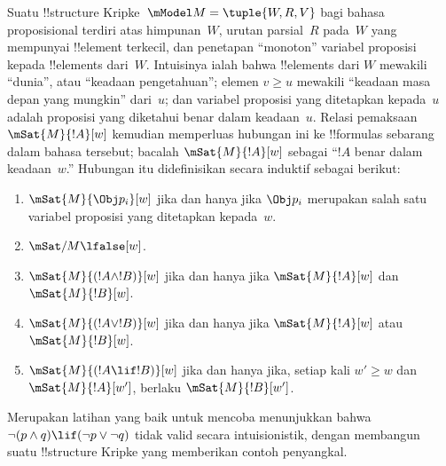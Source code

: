 \documentclass[../../../include/open-logic-section]{subfiles}
\begin{document}
Suatu !!{structure} Kripke~$\mModel M = \tuple{W, R, V}$ bagi bahasa
proposisional terdiri atas himpunan~$W$, urutan parsial~$R$ pada~$W$ yang
mempunyai !!{element} terkecil, dan penetapan ``monoton'' variabel proposisi
kepada !!{element}s dari~$W$. Intuisinya ialah bahwa !!{element}s dari $W$
mewakili ``dunia'', atau ``keadaan pengetahuan''; elemen $v \geq u$ mewakili
``keadaan masa depan yang mungkin'' dari~$u$; dan variabel proposisi yang
ditetapkan kepada~$u$ adalah proposisi yang diketahui benar dalam keadaan~$u$.
Relasi pemaksaan $\mSat{M}{!A}[w]$ kemudian memperluas hubungan ini ke
!!{formula}s sebarang dalam bahasa tersebut; bacalah $\mSat{M}{!A}[w]$
sebagai ``$!A$ benar dalam keadaan~$w$.'' Hubungan itu didefinisikan secara
induktif sebagai berikut:
\begin{enumerate}
\item $\mSat{M}{\Obj p_i}[w]$ jika dan hanya jika $\Obj p_i$ merupakan salah
  satu variabel proposisi yang ditetapkan kepada~$w$.
\item $\mSat/{M}{\lfalse}[w]$.
\item $\mSat{M}{(!A \land !B)}[w]$ jika dan hanya jika
  $\mSat{M}{!A}[w]$ dan $\mSat{M}{!B}[w]$.
\item $\mSat{M}{(!A \lor !B)}[w]$ jika dan hanya jika
  $\mSat{M}{!A}[w]$ atau $\mSat{M}{!B}[w]$.
\item $\mSat{M}{(!A \lif !B)}[w]$ jika dan hanya jika, setiap kali
  $w' \geq w$ dan $\mSat{M}{!A}[w']$, berlaku $\mSat{M}{!B}[w']$.
\end{enumerate}
Merupakan latihan yang baik untuk mencoba menunjukkan bahwa $\lnot (p \land
q) \lif (\lnot p \lor \lnot q)$ tidak valid secara intuisionistik, dengan
membangun suatu !!{structure} Kripke yang memberikan contoh penyangkal.
\end{document}
